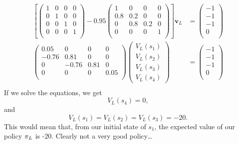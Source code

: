 \documentclass[a4paper]{article}
\begin{document}
\begin{align*}
  \left[
    \begin{pmatrix}
      1 & 0 & 0 & 0 \\
      0 & 1 & 0 & 0 \\
      0 & 0 & 1 & 0 \\
      0 & 0 & 0 & 1 \\
    \end{pmatrix}
    - 0.95
    \begin{pmatrix}
      1   & 0   & 0   & 0 \\
      0.8 & 0.2 & 0   & 0 \\
      0   & 0.8 & 0.2 & 0 \\
      0   & 0   & 0   & 1 \\
    \end{pmatrix}
  \right]
  \mathbf{v}_L &=
  \begin{pmatrix}
    -1 \\ -1 \\ -1 \\ 0 \\
  \end{pmatrix} \\
  \begin{pmatrix}
    0.05  & 0     & 0    & 0    \\
    -0.76 & 0.81  & 0    & 0    \\
    0     & -0.76 & 0.81 & 0    \\
    0     & 0     & 0    & 0.05 \\
  \end{pmatrix}
  \begin{pmatrix}
    V_L(s_1) \\
    V_L(s_2) \\
    V_L(s_3) \\
    V_L(s_4)
  \end{pmatrix}
  &=
  \begin{pmatrix}
    -1 \\ -1 \\ -1 \\ 0 \\
  \end{pmatrix} \\
\end{align*}
If we solve the equations, we get
$$V_L(s_4) = 0 ,$$
and
$$V_L(s_1) = V_L(s_2) = V_L(s_3) = -20 .$$
This would mean that, from our initial state of $s_1$,
the expected value of our policy $\pi_L$ is -20.
Clearly not a very good policy\dots
\end{document}
